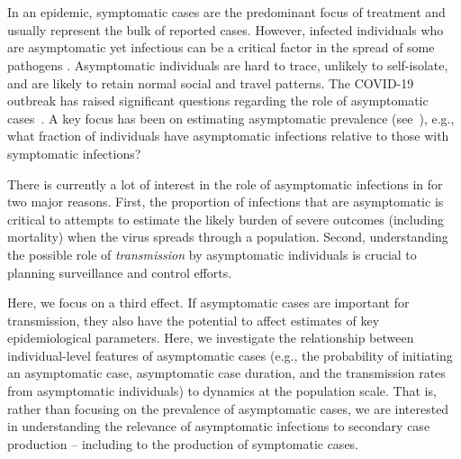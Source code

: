 \DIFaddbegin \section{}

\DIFaddend In an epidemic, symptomatic cases are the predominant focus of treatment and usually represent the bulk of reported cases. 
However, infected individuals who are asymptomatic yet infectious can be a critical factor in the spread of some pathogens \citep{fraser2004factors}.
Asymptomatic individuals are hard to trace, unlikely to self-isolate, and are likely to retain normal social and travel patterns.
The COVID-19 outbreak has raised significant
questions regarding the role of asymptomatic cases~\citep{fauci_nejm2020}.
A key focus has been on estimating asymptomatic prevalence (see~\citep{mizumoto_2020}), e.g., what fraction of individuals have asymptomatic infections relative to those with symptomatic infections?

There is currently a lot of interest in the role of asymptomatic infections in \DIFdelbegin {}\DIFdelend \DIFaddbegin {}\DIFaddend for two major reasons. 
First, the proportion of infections that are asymptomatic is critical to attempts to estimate the likely burden of severe outcomes (including mortality) when the virus spreads through a population.
Second, understanding the possible role of \emph{transmission} by asymptomatic individuals is crucial to planning surveillance and control efforts.

Here, we focus on a third effect. 
If asymptomatic cases are important for transmission, they also have the potential to affect estimates of key epidemiological parameters. 
Here, we investigate the relationship between individual-level features of asymptomatic cases (e.g., the probability of initiating an asymptomatic case, asymptomatic case duration, and the transmission rates from asymptomatic individuals) to dynamics at the population scale. 
That is, rather than focusing on the prevalence
of asymptomatic cases, we are interested in understanding the
relevance of asymptomatic infections to secondary case production -- including
to the production of symptomatic cases.

